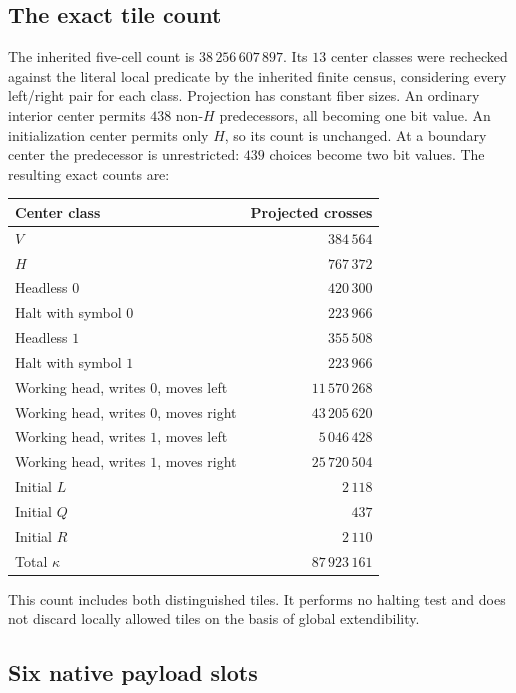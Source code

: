 \subsection{The exact tile count}

The inherited five-cell count is $38\,256\,607\,897$.  Its $13$ center
classes were rechecked against the literal local predicate by the
inherited finite census, considering every left/right pair for each
class.  Projection has constant fiber sizes.  An ordinary interior
center permits $438$ non-$H$ predecessors, all becoming one bit value.
An initialization center permits only $H$, so its count is unchanged.
At a boundary center the predecessor is unrestricted: $439$ choices
become two bit values.  The resulting exact counts are:
\begin{center}
\begin{tabular}{lr}
\toprule
Center class & Projected crosses\\
\midrule
$V$ & $384\,564$\\
$H$ & $767\,372$\\
Headless $0$ & $420\,300$\\
Halt with symbol $0$ & $223\,966$\\
Headless $1$ & $355\,508$\\
Halt with symbol $1$ & $223\,966$\\
Working head, writes $0$, moves left & $11\,570\,268$\\
Working head, writes $0$, moves right & $43\,205\,620$\\
Working head, writes $1$, moves left & $5\,046\,428$\\
Working head, writes $1$, moves right & $25\,720\,504$\\
Initial $L$ & $2\,118$\\
Initial $Q$ & $437$\\
Initial $R$ & $2\,110$\\
\midrule
Total $\kappa$ & $87\,923\,161$\\
\bottomrule
\end{tabular}
\end{center}
This count includes both distinguished tiles.  It performs no halting
test and does not discard locally allowed tiles on the basis of global
extendibility.

\subsection{Six native payload slots}

